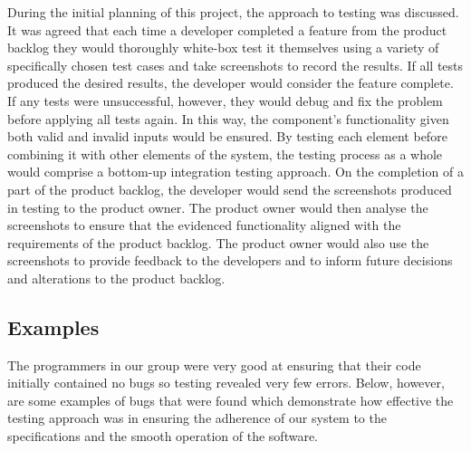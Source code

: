 \documentclass[12pt]{article}
\begin{document}
During the initial planning of this project, the approach to testing was
discussed. It was agreed that each time a developer completed a feature from the
product backlog they would thoroughly white-box test it themselves using a
variety of specifically chosen test cases and take screenshots to record the
results. If all tests produced the desired results, the developer would consider
the feature complete. If any tests were unsuccessful, however, they would debug
and fix the problem before applying all tests again. In this way, the component's
functionality given both valid and invalid inputs would be ensured. By testing
each element before combining it with other elements of the system, the testing
process as a whole would comprise a bottom-up integration testing approach. On
the completion of a part of the product backlog, the developer would send the
screenshots produced in testing to the product owner. The product owner would
then analyse the screenshots to ensure that the evidenced functionality aligned
with the requirements of the product backlog. The product owner would also use
the screenshots to provide feedback to the developers and to inform future
decisions and alterations to the product backlog.\par

\subsection{Examples}
The programmers in our group were very good at ensuring that their code initially 
contained no bugs so testing revealed very few errors. Below, however, are some 
examples of bugs that were found which demonstrate how effective the testing approach 
was in ensuring the adherence of our system to the specifications and the smooth 
operation of the software.\par
\end{document}
